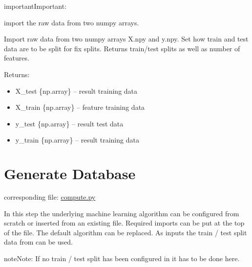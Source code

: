 \documentclass[letterpaper,10pt,english]{sphinxmanual}
\begin{document}
\begin{sphinxadmonition}{important}{Important:}

\begin{fulllineitems}
\label{\detokenize{Importing_Data:ForestFire.import_data.import_data}}
import the raw data from two numpy arrays.

Import raw data from two numpy arrays X.npy and y.npy. 
Set how train and test data are to be split for fix splits.
Returns train/test splits as well as number of features.

Returns:
\begin{itemize}
\item {} 
X\_test \{np.array\} -- result training data

\item {} 
X\_train \{np.array\} -- feature training data

\item {} 
y\_test \{np.array\} -- result test data

\item {} 
y\_train \{np.array\} -- result training data

\end{itemize}

\end{fulllineitems}

\end{sphinxadmonition}


\section{Generate Database}
\label{\detokenize{Generate_Database:generate-database}}\label{\detokenize{Generate_Database:compute}}\label{\detokenize{Generate_Database::doc}}
corresponding file: \href{https://github.com/weinertmos/ForestFire/blob/master/source/ForestFire/compute.py}{compute.py}

In this step the underlying machine learning algorithm can be configured from scratch or inserted from an existing file.
Required imports can be put at the top of the file.
The default algorithm can be replaced.
As inputs the train / test split data from {\hyperref[\detokenize{Importing_Data:import-data}]{}} can be used.

\begin{sphinxadmonition}{note}{Note:}
If no train / test split has been configured in {\hyperref[\detokenize{Importing_Data:import-data}]{}} it has to be done here.
\end{sphinxadmonition}
\end{document}
